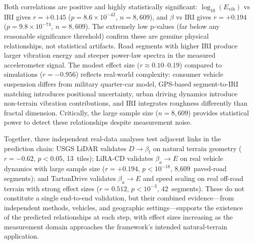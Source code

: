 \documentclass[11pt]{article}
\begin{document}
Both correlations are positive and highly statistically significant: $\log_{10}(E_{\mathrm{vib}})$ vs IRI gives $r = +0.145$ ($p = 8.6 \times 10^{-42}$, $n = 8{,}609$), and $\beta$ vs IRI gives $r = +0.194$ ($p = 9.8 \times 10^{-74}$, $n = 8{,}609$). The extremely low p-values (far below any reasonable significance threshold) confirm these are genuine physical relationships, not statistical artifacts. Road segments with higher IRI produce larger vibration energy and steeper power-law spectra in the measured accelerometer signal. The modest effect size ($r \approx 0.10$--$0.19$) compared to simulations ($r = -0.956$) reflects real-world complexity: consumer vehicle suspension differs from military quarter-car model, GPS-based segment-to-IRI matching introduces positional uncertainty, urban driving dynamics introduce non-terrain vibration contributions, and IRI integrates roughness differently than fractal dimension. Critically, the large sample size ($n = 8{,}609$) provides statistical power to detect these relationships despite measurement noise.

Together, three independent real-data analyses test adjacent links in the prediction chain: USGS LiDAR validates $D \rightarrow \beta_t$ on natural terrain geometry ($r = -0.62$, $p < 0.05$, 13~tiles); LiRA-CD validates $\beta_a \rightarrow E$ on real vehicle dynamics with large sample size ($r = +0.194$, $p < 10^{-18}$, 8,609~paved-road segments); and TartanDrive validates $\beta_a \rightarrow E$ and speed scaling on real off-road terrain with strong effect sizes ($r = 0.512$, $p < 10^{-3}$, 42~segments). These do not constitute a single end-to-end validation, but their combined evidence---from independent methods, vehicles, and geographic settings---supports the existence of the predicted relationships at each step, with effect sizes increasing as the measurement domain approaches the framework's intended natural-terrain application.
\end{document}
